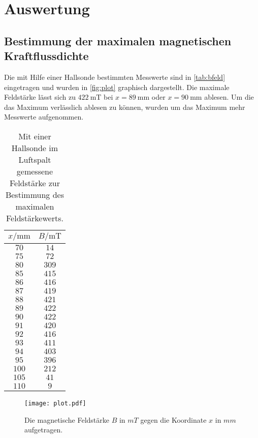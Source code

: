 \section{Auswertung}
\label{sec:Auswertung}

\subsection{Bestimmung der maximalen magnetischen Kraftflussdichte}
Die mit Hilfe einer Hallsonde bestimmten Messwerte sind in \autoref{tab:bfeld} eingetragen und wurden in
\autoref{fig:plot} graphisch dargestellt. Die maximale Feldstärke lässt sich zu $\SI{422}{\milli\tesla}$
bei $x=\SI{89}{\milli\meter}$ oder $x=\SI{90}{\milli\meter}$ ablesen. Um die das Maximum verlässlich ablesen
zu können, wurden um das Maximum mehr Messwerte aufgenommen.

\begin{table}
  \centering
  \caption{Mit einer Hallsonde im Luftspalt gemessene Feldstärke zur Bestimmung des maximalen Feldstärkewerts.}
  \label{tab:bfeld}
  \begin{tabular}{c c}
    \toprule
    $x/\si{\milli\meter}$ & $B/\si{\milli\tesla}$\\
    \midrule
    $ 70$ & $ 14$ \\
    $ 75$ & $ 72$ \\
    $ 80$ & $309$ \\
    $ 85$ & $415$ \\
    $ 86$ & $416$ \\
    $ 87$ & $419$ \\
    $ 88$ & $421$ \\
    $ 89$ & $422$ \\
    $ 90$ & $422$ \\
    $ 91$ & $420$ \\
    $ 92$ & $416$ \\
    $ 93$ & $411$ \\
    $ 94$ & $403$ \\
    $ 95$ & $396$ \\
    $100$ & $212$ \\
    $105$ & $ 41$ \\
    $110$ & $  9$ \\
    \bottomrule
  \end{tabular}
\end{table}

\begin{figure}
  \centering
  \texttt{[image: plot.pdf]}
  \caption{Die magnetische Feldstärke $B$ in $mT$ gegen die Koordinate $x$ in $mm$ aufgetragen.}
  \label{fig:plot}
\end{figure}

